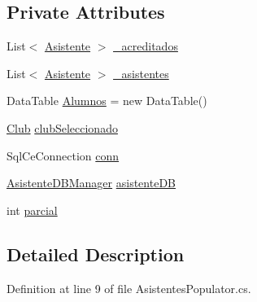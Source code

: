 \subsection*{Private Attributes}
\begin{DoxyCompactItemize}
\item 
List$<$ \hyperlink{class_asistencias__wpf_1_1_asistente}{Asistente} $>$ \hyperlink{class_asistencias__wpf_1_1_asistentes_populator_acb5b7e513ea3e1df015d7fedaa5c2624}{\-\_\-acreditados}
\item 
List$<$ \hyperlink{class_asistencias__wpf_1_1_asistente}{Asistente} $>$ \hyperlink{class_asistencias__wpf_1_1_asistentes_populator_a84a4c12da1ef4556f1cfefbea12902b8}{\-\_\-asistentes}
\item 
Data\-Table \hyperlink{class_asistencias__wpf_1_1_asistentes_populator_a5be02a2b0beb32f0c8b2aef488303359}{Alumnos} = new Data\-Table()
\item 
\hyperlink{class_asistencias__wpf_1_1_club}{Club} \hyperlink{class_asistencias__wpf_1_1_asistentes_populator_a33a9f65088b3243c8473180e80e322d9}{club\-Seleccionado}
\item 
Sql\-Ce\-Connection \hyperlink{class_asistencias__wpf_1_1_asistentes_populator_aea7e955756112dc99c093514621320c7}{conn}
\item 
\hyperlink{class_asistencias__wpf_1_1_asistente_d_b_manager}{Asistente\-D\-B\-Manager} \hyperlink{class_asistencias__wpf_1_1_asistentes_populator_ab64596c710fa43f2a8391a4a3f662031}{asistente\-D\-B}
\item 
int \hyperlink{class_asistencias__wpf_1_1_asistentes_populator_abe2a5ad9e46aa901e8c8e9bbf03ef653}{parcial}
\end{DoxyCompactItemize}


\subsection{Detailed Description}


Definition at line 9 of file Asistentes\-Populator.\-cs.




